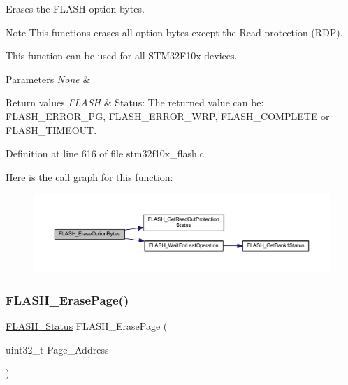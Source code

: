 Erases the F\+L\+A\+SH option bytes. 

\begin{DoxyNote}{Note}
This functions erases all option bytes except the Read protection (R\+DP). 

This function can be used for all S\+T\+M32\+F10x devices. 
\end{DoxyNote}

\begin{DoxyParams}{Parameters}
{\em None} & \\
\hline
\end{DoxyParams}

\begin{DoxyRetVals}{Return values}
{\em F\+L\+A\+SH} & Status\+: The returned value can be\+: F\+L\+A\+S\+H\+\_\+\+E\+R\+R\+O\+R\+\_\+\+PG, F\+L\+A\+S\+H\+\_\+\+E\+R\+R\+O\+R\+\_\+\+W\+RP, F\+L\+A\+S\+H\+\_\+\+C\+O\+M\+P\+L\+E\+TE or F\+L\+A\+S\+H\+\_\+\+T\+I\+M\+E\+O\+UT. \\
\hline
\end{DoxyRetVals}


Definition at line 616 of file stm32f10x\+\_\+flash.\+c.

Here is the call graph for this function\+:
\nopagebreak
\begin{figure}[H]
\begin{center}
\leavevmode
\includegraphics[width=350pt]{group___f_l_a_s_h___exported___functions_ga152768609e85d74a9d8474be8dc2874b_cgraph}
\end{center}
\end{figure}
\mbox{\label{group___f_l_a_s_h___exported___functions_ga13a2ca18bfb3d5fb827a2751799f8451}} 
\subsubsection{\texorpdfstring{F\+L\+A\+S\+H\+\_\+\+Erase\+Page()}{FLASH\_ErasePage()}}
{\footnotesize\ttfamily \hyperlink{group___f_l_a_s_h___exported___types_gadc63a6f3404ff1f71229a66915e9cdc0}{F\+L\+A\+S\+H\+\_\+\+Status} F\+L\+A\+S\+H\+\_\+\+Erase\+Page (\begin{DoxyParamCaption}\item[{uint32\+\_\+t}]{Page\+\_\+\+Address }\end{DoxyParamCaption})}



